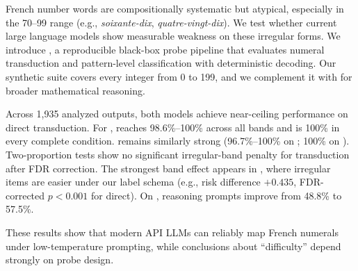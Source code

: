 French number words are compositionally systematic but atypical, especially in the 70--99 range (e.g., \textit{soixante-dix}, \textit{quatre-vingt-dix}). We test whether current large language models show measurable weakness on these irregular forms. We introduce \frcountmap, a reproducible black-box probe pipeline that evaluates numeral transduction and pattern-level classification with deterministic decoding. Our synthetic suite covers every integer from 0 to 199, and we complement it with \mgsmfr for broader mathematical reasoning.

Across 1,935 analyzed outputs, both models achieve near-ceiling performance on direct transduction. For \gptfourone, \digitword reaches 98.6\%--100\% across all bands and \worddigit is 100\% in every complete condition. \gptfouronemini remains similarly strong (96.7\%--100\% on \digitword; 100\% on \worddigit). Two-proportion tests show no significant irregular-band penalty for transduction after FDR correction. The strongest band effect appears in \patterncls, where irregular items are easier under our label schema (e.g., risk difference $+0.435$, FDR-corrected $p<0.001$ for \gptfourone direct). On \mgsmfr, reasoning prompts improve \gptfourone from 48.8\% to 57.5\%.

These results show that modern API LLMs can reliably map French numerals under low-temperature prompting, while conclusions about ``difficulty'' depend strongly on probe design.

